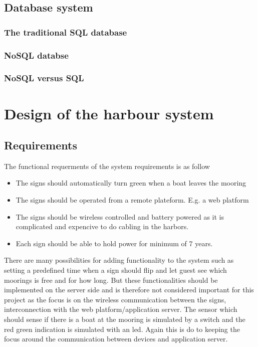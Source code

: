 \documentclass[a4paper,12pt,english]{article}
\begin{document}
\subsection{Database system}
\subsubsection{The traditional SQL database}
\subsubsection{NoSQL databse}
\subsubsection{NoSQL versus SQL}

\section{Design of the harbour system}
\subsection{Requirements}
The functional requerments of the system requirements is as follow

\begin{itemize}
	\item The signs should automatically turn green when a boat leaves the mooring
	\item The signs should be operated from a remote plateform. E.g. a web platform
	\item The signs should be wireless controlled and battery powered as it is
	      complicated and expencive to do cabling in the harbors.
	\item Each sign should be able to hold power for minimum of 7 years.
\end{itemize}

There are
many possibilities for adding functionality to the system such as setting a
predefined time when a sign should flip and let guest see which moorings is
free and for how long. But these functionalities should be implemented on the
server side and is therefore not considered important for this project as the
focus is on the wireless communication between the signs, interconnection with the web
platform/application server. The sensor which should sense if there is a boat
at the mooring is simulated by a switch and the red green indication is
simulated with an led. Again this is do to keeping the focus around the
communication between devices and application server.
\end{document}
